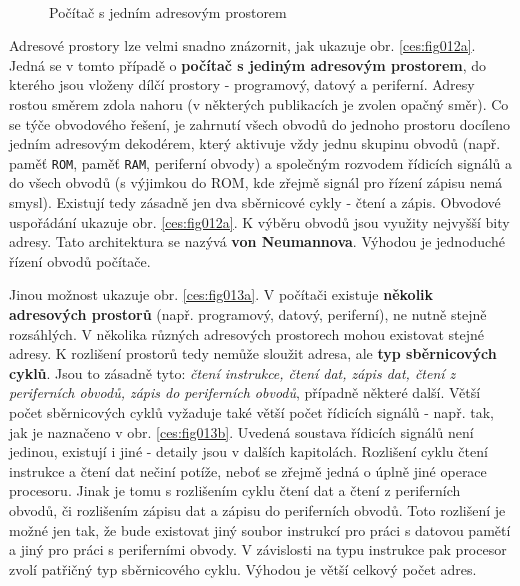       \begin{figure}[ht!]
        \centering  
          {}               \\
          {}              
        \caption{Počítač s jedním adresovým prostorem}
      \end{figure}
            
      Adresové prostory lze velmi snadno znázornit, jak ukazuje obr. \ref{ces:fig012a}. Jedná 
      se v tomto případě o \textbf{počítač s jediným adresovým prostorem}, do kterého jsou vloženy 
      dílčí prostory  - programový, datový a periferní. Adresy rostou směrem zdola nahoru (v 
      některých publikacích je zvolen opačný směr). Co se týče obvodového řešení, je zahrnutí všech 
      obvodů do jednoho prostoru docíleno jedním adresovým dekodérem, který aktivuje vždy jednu 
      skupinu obvodů (např. paměť \texttt{ROM}, paměť \texttt{RAM}, periferní obvody) a společným 
      rozvodem řídicích signálů  a   do všech obvodů (s výjimkou do ROM, 
      kde zřejmě signál  pro řízení zápisu nemá smysl). Existují tedy 
      zásadně jen dva sběrnicové cykly - čtení a zápis. Obvodové uspořádání ukazuje obr. 
      \ref{ces:fig012a}. K výběru obvodů jsou využity nejvyšší bity adresy. Tato architektura 
      se nazývá \textbf{von Neumannova}. Výhodou je jednoduché řízení obvodů počítače.

      Jinou možnost ukazuje obr. \ref{ces:fig013a}. V počítači existuje \textbf{několik 
      adresových prostorů} (např. programový, datový, periferní), ne nutně stejně rozsáhlých. V 
      několika různých adresových prostorech mohou existovat stejné adresy. K rozlišení prostorů 
      tedy nemůže sloužit adresa, ale \textbf{typ sběrnicových cyklů}. Jsou to zásadně tyto: 
      \emph{čtení instrukce, čtení dat, zápis dat, čtení z periferních obvodů, zápis do periferních 
      obvodů}, případně některé další. Větší počet sběrnicových cyklů vyžaduje také větší počet 
      řídicích signálů - např. tak, jak je naznačeno v obr. \ref{ces:fig013b}. Uvedená 
      soustava řídicích signálů není jedinou, existují i jiné - detaily jsou v dalších kapitolách. 
      Rozlišení cyklu čtení instrukce a čtení dat nečiní potíže, neboť se zřejmě jedná o úplně jiné 
      operace procesoru. Jinak je tomu s rozlišením cyklu čtení dat a čtení z periferních    
      obvodů, či rozlišením zápisu dat a zápisu do periferních obvodů. Toto rozlišení je možné jen 
      tak, že bude existovat jiný soubor instrukcí pro práci s datovou pamětí a jiný pro práci s 
      periferními obvody. V závislosti na typu instrukce pak procesor zvolí patřičný typ 
      sběrnicového cyklu. Výhodou je větší celkový počet adres.
      
